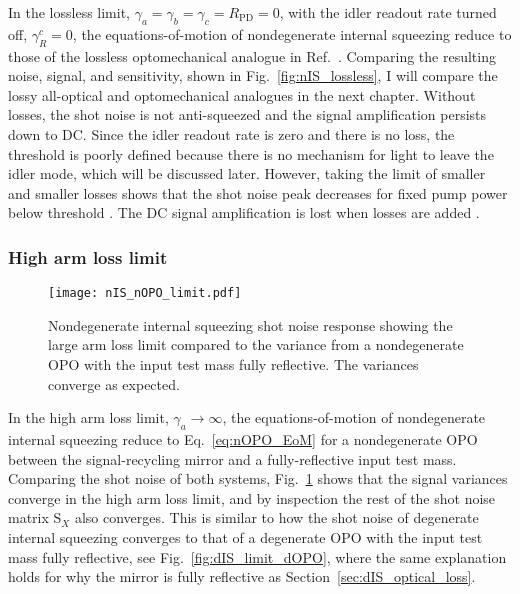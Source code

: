 In the lossless limit, $\gamma_a=\gamma_b=\gamma_c=R_\text{PD}=0$, with the idler readout rate turned off, $\gamma^c_R=0$, the equations-of-motion of nondegenerate internal squeezing reduce to those of the lossless optomechanical analogue in Ref.~\cite{Li2020}. Comparing the resulting noise, signal, and sensitivity, shown in Fig.~\ref{fig:nIS_lossless}, 
I will compare the lossy all-optical and optomechanical analogues in the next chapter. 
Without losses, the shot noise is not anti-squeezed and the signal amplification persists down to DC. Since the idler readout rate is zero and there is no loss, the threshold is poorly defined because there is no mechanism for light to leave the idler mode, which will be discussed later. However, taking the limit of smaller and smaller losses shows that the shot noise peak decreases for fixed pump power below threshold . The DC signal amplification is lost when losses are added .


\subsubsection{High arm loss limit}
\label{sec:nOPO_reduction}

\begin{figure}
	\centering
	\texttt{[image: nIS\_nOPO\_limit.pdf]}
	\caption{  Nondegenerate internal squeezing shot noise response showing the large arm loss limit compared to the variance from a nondegenerate OPO with the input test mass fully reflective. The variances converge as expected.}
	\label{fig:nIS_signal_nOPO_limit}
\end{figure}

In the high arm loss limit, $\gamma_a\rightarrow\infty$, the equations-of-motion of nondegenerate internal squeezing reduce to Eq.~\ref{eq:nOPO_EoM} for a nondegenerate OPO between the signal-recycling mirror and a fully-reflective input test mass. Comparing the shot noise of both systems, Fig.~\ref{fig:nIS_signal_nOPO_limit} shows that the signal variances converge in the high arm loss limit, and by inspection the rest of the shot noise matrix $\text{S}_X$ also converges. This is similar to how the shot noise of degenerate internal squeezing converges to that of a degenerate OPO with the input test mass fully reflective, see Fig.~\ref{fig:dIS_limit_dOPO}, where the same explanation holds for why the mirror is fully reflective as Section~\ref{sec:dIS_optical_loss}. 

